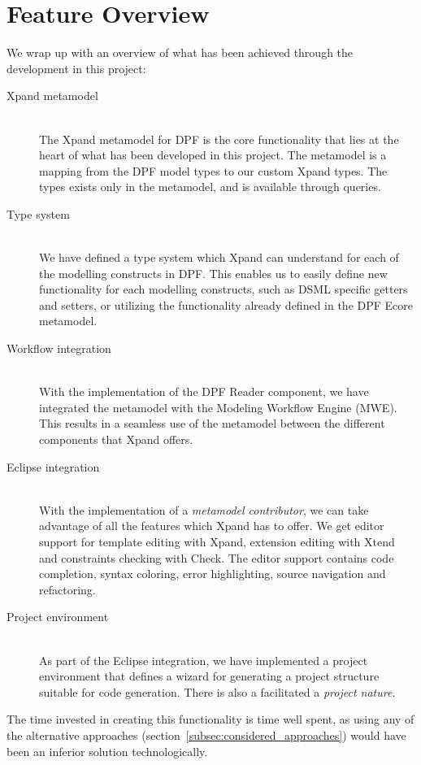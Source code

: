 \section{Feature Overview}
We wrap up with an overview of what has been achieved through the development in this project:
\begin{description}
  \item[Xpand metamodel] \hfill \\
  The Xpand metamodel for DPF is the core functionality that lies at the heart of what has been developed in this project. The metamodel is a mapping from the DPF model types to our custom Xpand types. The types exists only in the metamodel, and is available through queries.
  \item[Type system] \hfill \\
  We have defined a type system which Xpand can understand for each of the modelling constructs in DPF. This enables us to easily define new functionality for each modelling constructs, such as DSML specific getters and setters, or utilizing the functionality already defined in the DPF Ecore metamodel.
  \item[Workflow integration] \hfill \\
  With the implementation of the DPF Reader component, we have integrated the metamodel with the Modeling Workflow Engine (MWE). This results in a seamless use of the metamodel between the different components that Xpand offers.
  \item[Eclipse integration] \hfill \\
  With the implementation of a \emph{metamodel contributor}, we can take advantage of all the features which Xpand has to offer. We get editor support for template editing with Xpand, extension editing with Xtend and constraints checking with Check. The editor support contains code completion, syntax coloring, error highlighting, source navigation and refactoring. 
  \item[Project environment] \hfill \\
  As part of the Eclipse integration, we have implemented a project environment that defines a wizard for generating a project structure suitable for code generation. There is also a facilitated a \emph{project nature}.
\end{description}

The time invested in creating this functionality is time well spent, as using any of the alternative approaches (section~\ref{subsec:considered_approaches}) would have been an inferior solution technologically.

